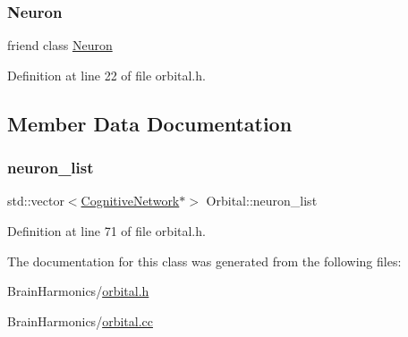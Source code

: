 \subsubsection{\texorpdfstring{Neuron}{Neuron}}
{\footnotesize\ttfamily friend class \mbox{\hyperlink{class_neuron}{Neuron}}\hspace{0.3cm}{\ttfamily [friend]}}



Definition at line 22 of file orbital.\+h.



\subsection{Member Data Documentation}
\mbox{\label{class_orbital_a504f1b3e8621e7eb7e682c3cec48272d}} 
\subsubsection{\texorpdfstring{neuron\+\_\+list}{neuron\_list}}
{\footnotesize\ttfamily std\+::vector$<$\mbox{\hyperlink{class_cognitive_network}{Cognitive\+Network}}$\ast$$>$ Orbital\+::neuron\+\_\+list\hspace{0.3cm}{\ttfamily [protected]}}



Definition at line 71 of file orbital.\+h.



The documentation for this class was generated from the following files\+:\begin{DoxyCompactItemize}
\item 
Brain\+Harmonics/\mbox{\hyperlink{orbital_8h}{orbital.\+h}}\item 
Brain\+Harmonics/\mbox{\hyperlink{orbital_8cc}{orbital.\+cc}}\end{DoxyCompactItemize}
